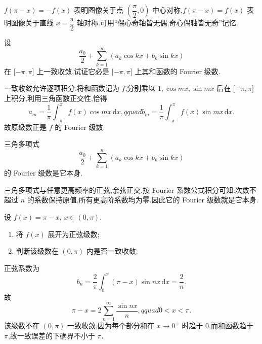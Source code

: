 \begin{remark}
    $f(\pi-x)=-f(x)$ 表明图像关于点 $\left(\dfrac{\pi}{2},0\right)$ 中心对称,$f(\pi-x)=f(x)$ 表明图像关于直线 $x=\dfrac{\pi}{2}$ 轴对称.可用``偶心奇轴皆无偶,奇心偶轴皆无奇''记忆.
\end{remark}

\begin{example}
    设
    \[
        \dfrac{a_0}{2}+\sum\limits_{k=1}^{\infty}(a_k\cos kx+b_k\sin kx)
    \]
    在 $\lbrack -\pi,\pi\rbrack$ 上一致收敛,试证它必是 $\lbrack -\pi,\pi\rbrack$ 上其和函数的 Fourier 级数.
\end{example}
\exampleblank

\begin{solution}
    一致收敛允许逐项积分.将和函数记为 $f$,分别乘以
    $1,\cos mx,\sin mx$ 后在 $\lbrack-\pi,\pi\rbrack$ 上积分,利用三角函数正交性,恰得
    \[
        a_m=\dfrac{1}{\pi}\int_{-\pi}^{\pi}f(x)\cos mx\,\mathrm{d}x,qquad
        b_m=\dfrac{1}{\pi}\int_{-\pi}^{\pi}f(x)\sin mx\,\mathrm{d}x.
    \]
    故原级数正是 $f$ 的 Fourier 级数.
\end{solution}

\begin{example}[\markstar]
    三角多项式
    \[
        \dfrac{a_0}{2}+\sum\limits_{k=1}^{n}(a_k\cos kx+b_k\sin kx)
    \]
    的 Fourier 级数是它本身.
\end{example}
\exampleblank

\begin{solution}
    三角多项式与任意更高频率的正弦,余弦正交.按 Fourier 系数公式积分可知:次数不超过 $n$ 的系数保持原值,所有更高阶系数均为零.因此它的 Fourier 级数就是它本身.
\end{solution}

\begin{example}
    设 $f(x)=\pi-x$, $x\in(0,\pi)$.
    \begin{enumerate}
        \item 将 $f(x)$ 展开为正弦级数;
        \item 判断该级数在 $(0,\pi)$ 内是否一致收敛.
    \end{enumerate}
\end{example}
\exampleblank

\begin{solution}
    正弦系数为
    \[
        b_n=\dfrac{2}{\pi}\int_0^\pi(\pi-x)\sin nx\,\mathrm{d}x=\dfrac{2}{n}.
    \]
    故
    \[
        \pi-x=2\sum\limits_{n=1}^{\infty}\dfrac{\sin nx}{n},qquad0<x<\pi.
    \]
    该级数不在 $(0,\pi)$ 一致收敛,因为每个部分和在 $x\to0^+$ 时趋于 $0$,而和函数趋于 $\pi$,故一致误差的下确界不小于 $\pi$.
\end{solution}

